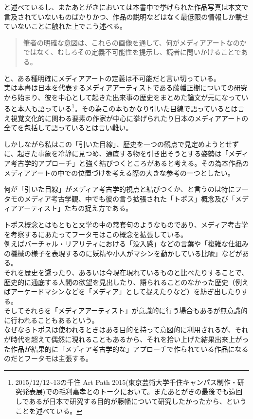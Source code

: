 と述べているし、またあとがきにおいては本書中で挙げられた作品写真は本文で言及されていないものばかりかつ、作品の説明などはなく最低限の情報しか載せていないことに触れた上でこう述べる。

\begin{quote}
筆者の明確な意図は、これらの画像を通して、何がメディアアートなのかではなく、むしろその定義不可能性を提示し、読者に問いかけることである。
\end{quote}

と、ある種明確にメディアアートの定義は不可能だと言い切っている。\\
実は本書は日本を代表するメディアアーティストである藤幡正樹についての研究から始まり、彼を中心として起きた出来事の歴史をまとめた論文が元になっていると本人も語っている\footnote{2015/12/12\textasciitilde{}13の千住
  Art Path
  2015(東京芸術大学千住キャンパス制作・研究発表展)での毛利嘉孝とのトークにおいて。またあとがきの最後でも遠回しであるが日本で研究する目的が藤幡について研究したかったから、ということを述べている。}。その為この本もかなり引いた目線で語っているとは言え視覚文化的に関わる要素の作家が中心に挙げられたり日本のメディアアートの全てを包括して語っているとは言い難い。

しかしながら私はこの「引いた目線」、歴史を一つの観点で見定めようとせずに、起きた事象を冷静に見つめ、通底する物を引き出そうとする姿勢は「メディア考古学的アプローチ」と強く結びつくところがあると考える。その為本作品のメディアアートの中での位置づけを考える際の大きな参考の一つとしたい。

何が「引いた目線」がメディア考古学的視点と結びつくか、と言うのは特にフータモのメディア考古学観、中でも彼の言う拡張された「トポス」概念及び「メディアアーティスト」たちの捉え方である。

トポス概念とはもともと文学の中の常套句のようなものであり、メディア考古学を考察するにあたってフータモはこの概念を拡張している。\\
例えばバーチャル・リアリティにおける「没入感」などの言葉や「複雑な仕組みの機械の様子を表現するのに妖精や小人がマシンを動かしている比喩」などがある。\\
それを歴史を遡ったり、あるいは今現在現れているものと比べたりすることで、歴史的に通底する人間の欲望を見出したり、語られることのなかった歴史（例えばアーケードマシンなどを「メディア」として捉えたりなど）を紡ぎ出したりする。\\
そしてそれらを「メディアアーティスト」が意識的に行う場合もあるが無意識的に行われることもあるという。\\
なぜならトポスは使われるときはある目的を持って意図的に利用されるが、それが時代を超えて偶然に現れることもあるから、それを拾い上げた結果出来上がった作品が結果的に「メディア考古学的な」アプローチで作られている作品になるのだとフータモは主張する。

